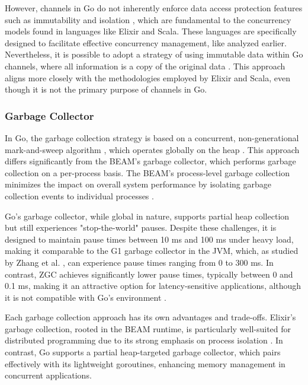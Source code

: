 However, channels in Go do not inherently enforce data access protection features such as immutability and isolation \cite{Kennedy2016}, which are fundamental to the concurrency models found in languages like Elixir and Scala. These languages are specifically designed to facilitate effective concurrency management, like analyzed earlier. Nevertheless, it is possible to adopt a strategy of using immutable data within Go channels, where all information is a copy of the original data \cite{Cox-Buday2017}. This approach aligns more closely with the methodologies employed by Elixir and Scala, even though it is not the primary purpose of channels in Go.

\subsubsection{Garbage Collector}

In Go, the garbage collection strategy is based on a concurrent, non-generational mark-and-sweep algorithm \cite{go-docs}, which operates globally on the heap \cite{Zhao2023}. This approach differs significantly from the BEAM's garbage collector, which performs garbage collection on a per-process basis. The BEAM's process-level garbage collection minimizes the impact on overall system performance by isolating garbage collection events to individual processes \cite{Juric2024}.

Go's garbage collector, while global in nature, supports partial heap collection but still experiences "stop-the-world" pauses. Despite these challenges, it is designed to maintain pause times between 10 ms and 100 ms under heavy load, making it comparable to the G1 garbage collector in the JVM, which, as studied by Zhang et al. \cite{Zhang2021}, can experience pause times ranging from 0 to 300 ms. In contrast, ZGC achieves significantly lower pause times, typically between 0 and 0.1 ms, making it an attractive option for latency-sensitive applications, although it is not compatible with Go's environment \cite{Castro2019}.

Each garbage collection approach has its own advantages and trade-offs. Elixir’s garbage collection, rooted in the BEAM runtime, is particularly well-suited for distributed programming due to its strong emphasis on process isolation \cite{Armstrong2013}. In contrast, Go supports a partial heap-targeted garbage collector, which pairs effectively with its lightweight goroutines, enhancing memory management in concurrent applications.

